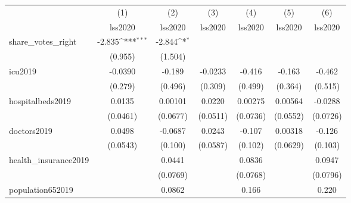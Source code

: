 {
\def\sym#1{\ifmmode^{#1}\else\(^{#1}\)\fi}
\begin{tabular}{l*{6}{c}}
\hline\hline
            &\multicolumn{1}{c}{(1)}&\multicolumn{1}{c}{(2)}&\multicolumn{1}{c}{(3)}&\multicolumn{1}{c}{(4)}&\multicolumn{1}{c}{(5)}&\multicolumn{1}{c}{(6)}\\
            &\multicolumn{1}{c}{lss2020}&\multicolumn{1}{c}{lss2020}&\multicolumn{1}{c}{lss2020}&\multicolumn{1}{c}{lss2020}&\multicolumn{1}{c}{lss2020}&\multicolumn{1}{c}{lss2020}\\
\hline
share\_votes\_right&      -2.835\sym{***}&      -2.844\sym{*}  &                     &                     &                     &                     \\
            &     (0.955)         &     (1.504)         &                     &                     &                     &                     \\
[1em]
icu2019     &     -0.0390         &      -0.189         &     -0.0233         &      -0.416         &      -0.163         &      -0.462         \\
            &     (0.279)         &     (0.496)         &     (0.309)         &     (0.499)         &     (0.364)         &     (0.515)         \\
[1em]
hospitalbeds2019&      0.0135         &     0.00101         &      0.0220         &     0.00275         &     0.00564         &     -0.0288         \\
            &    (0.0461)         &    (0.0677)         &    (0.0511)         &    (0.0736)         &    (0.0552)         &    (0.0726)         \\
[1em]
doctors2019 &      0.0498         &     -0.0687         &      0.0243         &      -0.107         &     0.00318         &      -0.126         \\
            &    (0.0543)         &     (0.100)         &    (0.0587)         &     (0.102)         &    (0.0629)         &     (0.103)         \\
[1em]
health\_insurance2019&                     &      0.0441         &                     &      0.0836         &                     &      0.0947         \\
            &                     &    (0.0769)         &                     &    (0.0768)         &                     &    (0.0796)         \\
[1em]
population652019&                     &      0.0862         &                     &       0.166         &                     &       0.220         \\

\end{tabular}}
